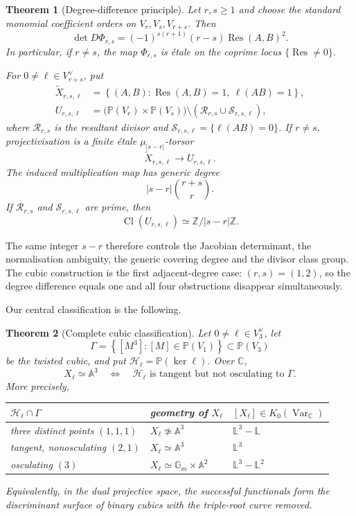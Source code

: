 \documentclass[11pt,reqno]{amsart}
\newtheorem{theorem}{Theorem}[section]
\theoremstyle{definition}
\theoremstyle{remark}
\newcommand{\A}{\mathbb A}
\newcommand{\Pj}{\mathbb P}
\newcommand{\Gm}{\mathbb G_m}
\newcommand{\C}{\mathbb C}
\newcommand{\Z}{\mathbb Z}
\newcommand{\cR}{\mathcal R}
\newcommand{\cS}{\mathcal S}
\newcommand{\cH}{\mathscr H}
\newcommand{\Res}{\operatorname{Res}}
\newcommand{\Cl}{\operatorname{Cl}}
\newcommand{\LL}{\mathbb L}
\newcommand{\KVar}{K_0(\operatorname{Var}_{\C})}
\newcommand{\abs}[1]{\lvert #1\rvert}
\newcommand{\set}[1]{\left\{#1\right\}}
\begin{document}
\begin{theorem}[Degree-difference principle]\label{thm:degree-difference-intro}
Let $r,s\ge1$ and choose the standard monomial coefficient orders on
$V_r,V_s,V_{r+s}$.  Then
\[
 \det D\Phi_{r,s}
 =(-1)^{s(r+1)}(r-s)\Res(A,B)^2.
\]
In particular, if $r\ne s$, the map $\Phi_{r,s}$ is étale on the coprime
locus $\{\Res\ne0\}$.

For $0\ne\ell\in V_{r+s}^\vee$, put
\begin{align*}
 \widetilde X_{r,s,\ell}
 &=\set{(A,B):\Res(A,B)=1,\ \ell(AB)=1},\\
 U_{r,s,\ell}
 &=\bigl(\Pj(V_r)\times\Pj(V_s)\bigr)
   \setminus(\cR_{r,s}\cup\cS_{r,s,\ell}),
\end{align*}
where $\cR_{r,s}$ is the resultant divisor and
$\cS_{r,s,\ell}=\{\ell(AB)=0\}$.  If $r\ne s$, projectivisation is a
finite étale $\mu_{\abs{s-r}}$-torsor
\[
 \widetilde X_{r,s,\ell}\longrightarrow U_{r,s,\ell}.
\]
The induced multiplication map has generic degree
\[
 \abs{s-r}\binom{r+s}{r}.
\]
If $\cR_{r,s}$ and $\cS_{r,s,\ell}$ are prime, then
\[
 \Cl(U_{r,s,\ell})\simeq\Z/\abs{s-r}\Z.
\]
\end{theorem}

The same integer $s-r$ therefore controls the Jacobian determinant, the
normalisation ambiguity, the generic covering degree and the divisor
class group.  The cubic construction is the first adjacent-degree case:
$(r,s)=(1,2)$, so the degree difference equals one and all four
obstructions disappear simultaneously.

Our central classification is the following.

\begin{theorem}[Complete cubic classification]\label{thm:classification-intro}
Let $0\ne\ell\in V_3^\vee$, let
\[
 \Gamma=\set{[M^3]:[M]\in\Pj(V_1)}\subset\Pj(V_3)
\]
be the twisted cubic, and put $\cH_\ell=\Pj(\ker\ell)$.  Over $\C$,
\[
 \boxed{
 X_\ell\simeq\A^3
 \quad\Longleftrightarrow\quad
 \cH_\ell\text{ is tangent but not osculating to }\Gamma.}
\]
More precisely,
\begin{center}
\begin{tabular}{@{}lll@{}}
\toprule
$\cH_\ell\cap\Gamma$ & geometry of $X_\ell$ & $[X_\ell]\in\KVar$\\
\midrule
three distinct points $(1,1,1)$ & $X_\ell\not\simeq\A^3$ & $\LL^3-\LL$\\
tangent, nonosculating $(2,1)$ & $X_\ell\simeq\A^3$ & $\LL^3$\\
osculating $(3)$ & $X_\ell\simeq\Gm\times\A^2$ & $\LL^3-\LL^2$\\
\bottomrule
\end{tabular}
\end{center}
Equivalently, in the dual projective space, the successful functionals
form the discriminant surface of binary cubics with the triple-root curve
removed.
\end{theorem}
\end{document}
